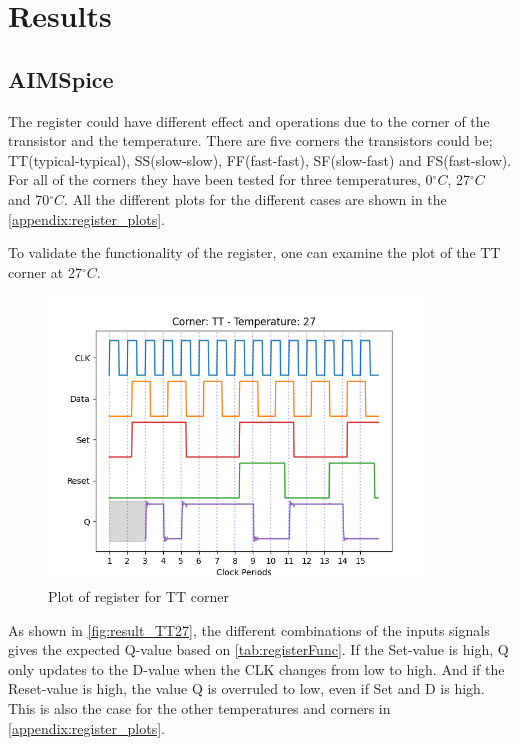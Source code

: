 \section{Results}
\label{sec:results}

\subsection{AIMSpice}

The register could have different effect and operations due to the corner of the transistor and the temperature. There are five corners the transistors could be; TT(typical-typical), SS(slow-slow), FF(fast-fast), SF(slow-fast) and FS(fast-slow).  For all of the corners they have been tested for three temperatures, 0$^\circ C$, 27$^\circ C$ and 70$^\circ C$. All the different plots for the different cases are shown in the \autoref{appendix:register_plots}. 

To validate the functionality of the register, one can examine the plot of the TT corner at 27$^\circ C$. 

\begin{figure}[H]
    \centering
    \includegraphics[width=0.9\textwidth]{Figures/Aimspice_Plots/TT_27.png}
    \caption{Plot of register for TT corner}
    \label{fig:result_TT27}
\end{figure}

As shown in \autoref{fig:result_TT27}, the different combinations of the inputs signals gives the expected Q-value based on \autoref{tab:registerFunc}. If the Set-value is high, Q only updates to the D-value when the CLK changes from low to high. And if the Reset-value is high, the value Q is overruled to low, even if Set and D is high. This is also the case for the other temperatures and corners in \autoref{appendix:register_plots}.

